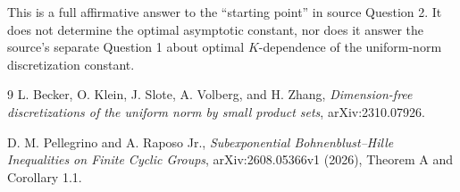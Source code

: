 \documentclass[11pt]{article}
\begin{document}
This is a full affirmative answer to the ``starting point'' in source
Question 2.  It does not determine the optimal asymptotic constant, nor
does it answer the source's separate Question 1 about optimal
$K$-dependence of the uniform-norm discretization constant.

\begin{thebibliography}{9}
L. Becker, O. Klein, J. Slote, A. Volberg, and H. Zhang,
\emph{Dimension-free discretizations of the uniform norm by small
product sets}, arXiv:2310.07926.

D. M. Pellegrino and A. Raposo Jr.,
\emph{Subexponential Bohnenblust--Hille Inequalities on Finite Cyclic
Groups}, arXiv:2608.05366v1 (2026), Theorem A and Corollary 1.1.
\end{thebibliography}
\end{document}
